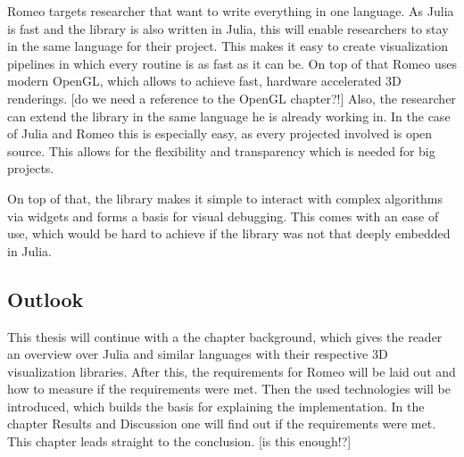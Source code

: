Romeo targets researcher that want to write everything in one language.
As Julia is fast and the library is also written in Julia, this will enable researchers to stay in the same language for their project. This makes it easy to create visualization pipelines in which every routine is as fast as it can be. 
On top of that Romeo uses modern OpenGL, which allows to achieve fast, hardware accelerated 3D renderings. [do we need a reference to the OpenGL chapter?!]
Also, the researcher can extend the library in the same language he is already working in. In the case of Julia and Romeo this is especially easy, as every projected involved is open source.
This allows for the flexibility and transparency which is needed for big projects.

On top of that, the library makes it simple to interact with complex algorithms via widgets and forms a basis for visual debugging. 
This comes with an ease of use, which would be hard to achieve if the library was not that deeply embedded in Julia.


\subsection{Outlook}
This thesis will continue with a the chapter background, which gives the reader an overview over Julia and similar languages with their respective 3D visualization libraries.
After this, the requirements for Romeo will be laid out and how to measure if the requirements were met.
Then the used technologies will be introduced, which builds the basis for explaining the implementation.
In the chapter Results and Discussion one will find out if the requirements were met.
This chapter leads straight to the conclusion.
[is this enough!?]